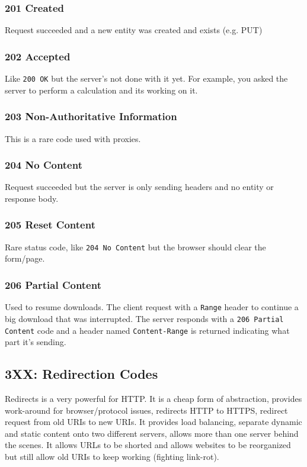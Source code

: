 \documentclass[../CMPUT-404-Notes.tex]{subfiles}
\begin{document}
\subsubsection{201 Created}
Request succeeded and a new entity was created and exists (e.g. PUT)

\subsubsection{202 Accepted}
Like \texttt{200 OK} but the server's not done with it yet. For example, you asked the server to perform a calculation and its working on it. 

\subsubsection{203 Non-Authoritative Information}
This is a rare code used with proxies.

\subsubsection{204 No Content}
Request succeeded but the server is only sending headers and no entity or response body.

\subsubsection{205 Reset Content}
Rare status code, like \texttt{204 No Content} but the browser should clear the form/page.

\subsubsection{206 Partial Content}
Used to resume downloads. The client request with a \texttt{Range} header to continue a big download that was interrupted.
The server responds with a \texttt{206 Partial Content} code and a header named \texttt{Content-Range} is returned indicating what part it's sending.

\subsection{3XX: Redirection Codes}
Redirects is a very powerful for HTTP. It is a cheap form of abstraction, provides work-around for browser/protocol issues, redirects HTTP to HTTPS, redirect request from old URIs to new URIs. 
It provides load balancing, separate dynamic and static content onto two different servers, allows more than one server behind the scenes. 
It allows URLs to be shorted and allows websites to be reorganized but still allow old URIs to keep working (fighting link-rot). 
\end{document}
